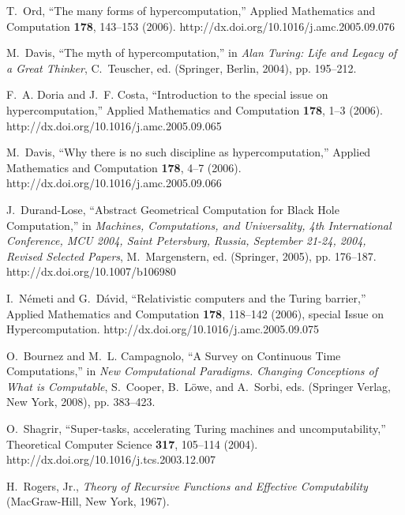 \documentclass[pre,showpacs,showkeys,preprint]{revtex4}
\theoremstyle{definition}
\begin{document}
\begin{thebibliography}{10}
T.~Ord, \enquote{The many forms of hypercomputation,} Applied Mathematics and
  Computation {\bf 178}, 143--153 (2006).
\newline http://dx.doi.org/10.1016/j.amc.2005.09.076

M.~Davis, \enquote{The myth of hypercomputation,} in {\em Alan Turing: Life and
  Legacy of a Great Thinker\/}, C.~Teuscher, ed.  (Springer, Berlin, 2004), pp.
  195--212.

F.~A. Doria and J.~F. Costa, \enquote{Introduction to the special issue on
  hypercomputation,} Applied Mathematics and Computation {\bf 178}, 1--3
  (2006).
\newline http://dx.doi.org/10.1016/j.amc.2005.09.065

M.~Davis, \enquote{Why there is no such discipline as hypercomputation,}
  Applied Mathematics and Computation {\bf 178}, 4--7 (2006).
\newline http://dx.doi.org/10.1016/j.amc.2005.09.066

J.~Durand-Lose, \enquote{Abstract Geometrical Computation for Black Hole
  Computation,} in {\em Machines, Computations, and Universality, 4th
  International Conference, MCU 2004, Saint Petersburg, Russia, September
  21-24, 2004, Revised Selected Papers\/}, M.~Margenstern, ed.  (Springer,
  2005), pp. 176--187.
\newline http://dx.doi.org/10.1007/b106980

I.~N{\'{e}}meti and G.~D{\'{a}}vid, \enquote{Relativistic computers and the
  Turing barrier,} Applied Mathematics and Computation {\bf 178}, 118--142
  (2006), special Issue on Hypercomputation.
\newline http://dx.doi.org/10.1016/j.amc.2005.09.075

O.~Bournez and M.~L. Campagnolo, \enquote{A Survey on Continuous Time
  Computations,} in {\em New Computational Paradigms. Changing Conceptions of
  What is Computable\/}, S.~Cooper, B.~L{\"o}we, and A.~Sorbi, eds.  (Springer
  Verlag, New York, 2008), pp. 383--423.

O.~Shagrir, \enquote{Super-tasks, accelerating {T}uring machines and
  uncomputability,} Theoretical Computer Science {\bf 317}, 105--114 (2004).
\newline http://dx.doi.org/10.1016/j.tcs.2003.12.007

H.~{Rogers, Jr.}, {\em Theory of Recursive Functions and Effective
  Computability\/} (MacGraw-Hill, New York, 1967).


\end{thebibliography}
\end{document}
